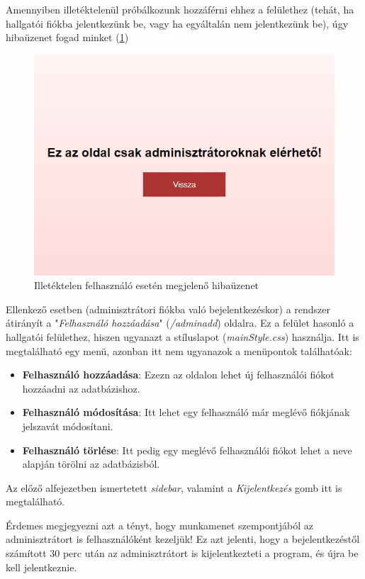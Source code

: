 Amennyiben illetéktelenül próbálkozunk hozzáférni ehhez a felülethez (tehát, ha hallgatói fiókba jelentkezünk be, vagy ha egyáltalán nem jelentkezünk be), úgy hibaüzenet fogad minket (\ref{fig:nemadmin})

\begin{figure}[h]
	\centering
		\includegraphics[width=10truecm, height=7truecm]{images/nemadmin.png}
	\caption{Illetéktelen felhasználó esetén megjelenő hibaüzenet}
	\label{fig:nemadmin}
\end{figure}

Ellenkező esetben (adminisztrátori fiókba való bejelentkezéskor) a rendszer átirányít a "\textit{Felhasználó hozzáadása}" (\textit{/adminadd}) oldalra. Ez a felület hasonló a hallgatói felülethez, hiszen ugyanazt a stíluslapot (\textit{mainStyle.css}) használja. Itt is megtalálható egy menü, azonban itt nem ugyanazok a menüpontok találhatóak:

\begin{itemize}
\item{\textbf{Felhasználó hozzáadása}: Ezezn az oldalon lehet új felhasználói fiókot hozzáadni az adatbázishoz.}
\item{\textbf{Felhasználó módosítása}: Itt lehet egy felhasználó már meglévő fiókjának jelszavát módosítani.}
\item{\textbf{Felhasználó törlése}: Itt pedig egy meglévő felhasználói fiókot lehet a neve alapján törölni az adatbázisból.}
\end{itemize}

Az előző alfejezetben ismertetett \textit{sidebar}, valamint a \textit{Kijelentkezés} gomb itt is megtalálható.

Érdemes megjegyezni azt a tényt, hogy munkamenet szempontjából az adminisztrátort is felhasználóként kezeljük! Ez azt jelenti, hogy a bejelentkezéstől számított 30 perc után az adminisztrátort is kijelentkezteti a program, és újra be kell jelentkeznie.
